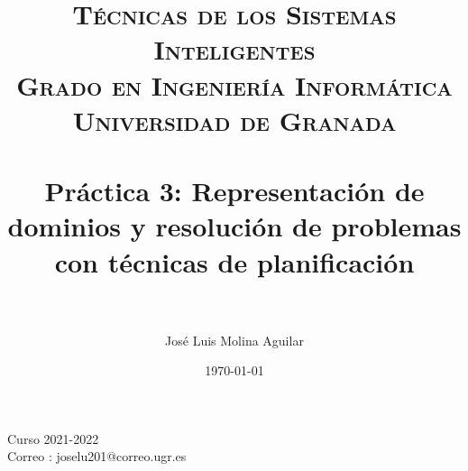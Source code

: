 

\everymath{\displaystyle}

\title{	
\normalfont \normalsize 
\textsc{\textbf{Técnicas de los Sistemas Inteligentes} \\ Grado en Ingeniería Informática \\ Universidad de Granada} \\ [25pt] %
\horrule{0.5pt} \\[0.4cm] %
\huge Práctica 3: Representación de dominios y resolución de problemas con técnicas de planificación  \\ %
\horrule{2pt} \\[0.5cm] %
}

\author{José Luis Molina Aguilar} %

\date{\normalsize\today} %






\maketitle %
  \begin{large}
    \centering
  \vfill
  
  Curso 2021-2022\\
  Correo : joselu201@correo.ugr.es
  \vfill
  \end{large}
\newpage %

\tableofcontents %

\listoftables


\newpage



\newpage
